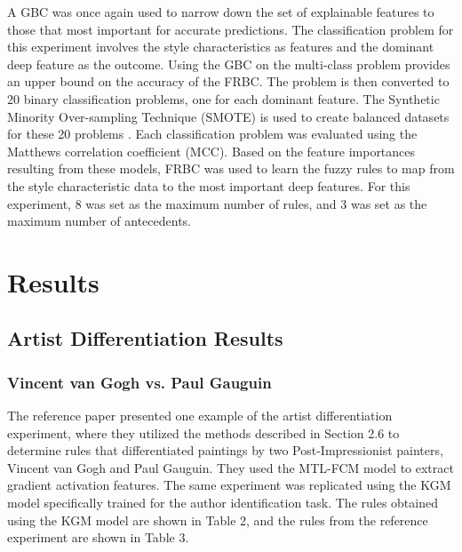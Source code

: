 \documentclass{article}
\begin{document}
A GBC was once again used to narrow down the set of explainable features to those that most important for accurate predictions. The classification problem for this experiment involves the style characteristics as features and the dominant deep feature as the outcome. Using the GBC on the multi-class problem provides an upper bound on the accuracy of the FRBC. The problem is then converted to 20 binary classification problems, one for each dominant feature. The Synthetic Minority Over-sampling Technique (SMOTE) is used to create balanced datasets for these 20 problems \cite{smote}. Each classification problem was evaluated using the Matthews correlation coefficient (MCC). Based on the feature importances resulting from these models, FRBC was used to learn the fuzzy rules to map from the style characteristic data to the most important deep features. For this experiment, 8 was set as the maximum number of rules, and 3 was set as the maximum number of antecedents.

\section{Results}

\subsection{Artist Differentiation Results}
\subsubsection{Vincent van Gogh vs. Paul Gauguin}
The reference paper presented one example of the artist differentiation experiment, where they utilized the methods described in Section 2.6 to determine rules that differentiated paintings by two Post-Impressionist painters, Vincent van Gogh and Paul Gauguin. They used the MTL-FCM model to extract gradient activation features. The same experiment was replicated using the KGM model specifically trained for the author identification task. The rules obtained using the KGM model are shown in Table 2, and the rules from the reference experiment are shown in Table 3. 

\begin{table}[h]
\centering
{}
\caption{Rules to differentiate Van Gogh and Gauguin (KGM)}
\label{tab:my-table}
\end{table}
\end{document}
